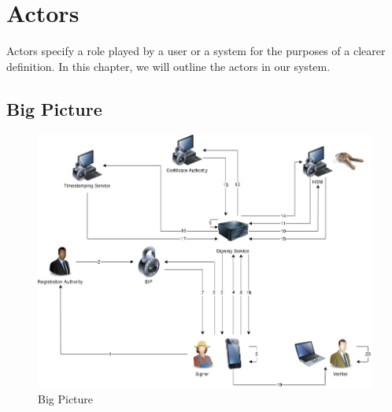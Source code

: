 \chapter{Actors}
\label{ch:actors}

Actors specify a role played by a user or a system for the purposes of a clearer definition.
In this chapter, we will outline the actors in our system.

\begin{landscape}
	\vspace*{\fill}
	\section{Big Picture}
	\begin{figure}[H]
		\begin{center}
			\includegraphics[scale=0.6]{images/BigPicture.png}
			\caption{Big Picture}
			\label{fig:bigpicture}
		\end{center}
	\end{figure}
	\vspace*{\fill}
\end{landscape}

